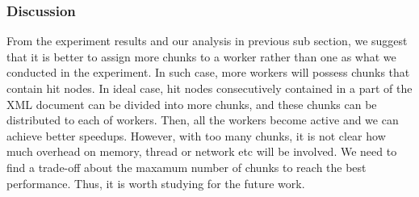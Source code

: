 \subsubsection{Discussion}

From the experiment results and our analysis in previous sub section, we suggest
that it is better to assign more chunks to a worker rather than one as what we
conducted in the experiment. In such case, more workers will possess chunks that
contain hit nodes. In ideal case, hit nodes consecutively contained in a part of
the XML document can be divided into more chunks, and these chunks can be
distributed to each of workers.  Then, all the workers become active and we can
achieve better speedups. However, with too many chunks, it is not clear how
much overhead on memory, thread or network etc will be involved. We need to find
a trade-off about the maxamum number of chunks to reach the best performance.
Thus, it is worth studying for the future work.



